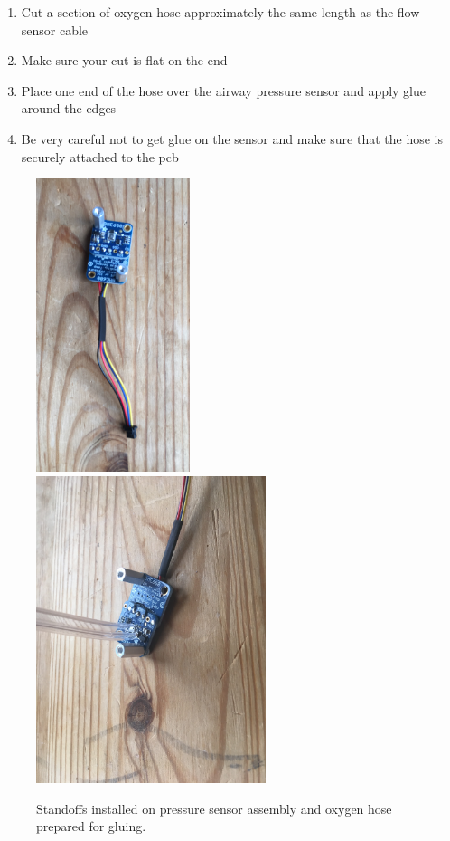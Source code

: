 \documentclass[11pt, letterpaper]{article}
\begin{document}
\begin{enumerate}
\begin{enumerate}[label=5.\arabic*]
\begin{enumerate}[label=5.1.\arabic*]
\item
Cut a section of oxygen hose approximately the same length as the flow sensor cable
\item
Make sure your cut is flat on the end
\item
Place one end of the hose over the airway pressure sensor and apply glue around the edges
\item
Be very careful not to get glue on the sensor and make sure that the hose is securely attached to the pcb
\end{enumerate}
\begin{figure}[H]
\centering
\includegraphics[width=0.4\textwidth]{images/bme_standoffs.JPG}
\includegraphics[width=0.6\textwidth, angle =90 ]{images/hotglue.JPG} 
\caption{Standoffs installed on pressure sensor assembly and oxygen hose prepared for gluing.} 
\label{fig:bme_glue}
\end{figure}


\end{enumerate}
\end{enumerate}
\end{document}
